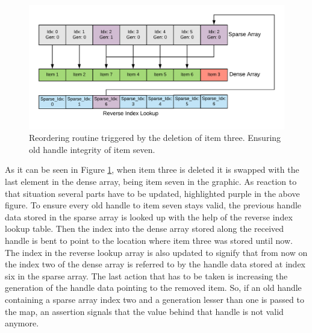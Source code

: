 \begin{figure}[h!]
	\centering \includegraphics[width=\linewidth]{PICs/handle_map_deletion.png}
	\caption{Reordering routine triggered by the deletion of item three. Ensuring old handle integrity of item seven.}
	\label{fig:handle_map_deletion}
\end{figure}

\newpage
\noindent
As it can be seen in Figure \ref{fig:handle_map_deletion}, when item three is deleted it is swapped with the last element in the dense array, being item seven in the graphic. As reaction to that situation several parts have to be updated, highlighted purple in the above figure. To ensure every old handle to item seven stays valid, the previous handle data stored in the sparse array is looked up with the help of the reverse index lookup table. Then the index into the dense array stored along the received handle is bent to point to the location where item three was stored until now. The index in the reverse lookup array is also updated to signify that from now on the index two of the dense array is referred to by the handle data stored at index six in the sparse array. The last action that has to be taken is increasing the generation of the handle data pointing to the removed item. So, if an old handle containing a sparse array index two and a generation lesser than one is passed to the map, an assertion signals that the value behind that handle is not valid anymore.\\

